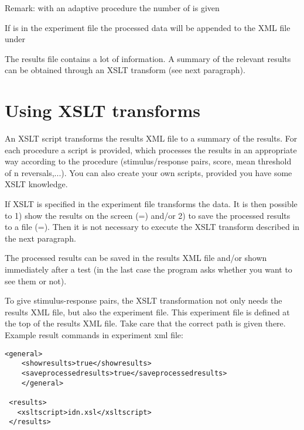 Remark: with an adaptive procedure the number of
 is given

If  is  in the experiment
file the processed data will be appended to the XML file under

The results file contains a lot of information. A summary of the
relevant results can be obtained through an XSLT transform (see
next paragraph).

\section{Using XSLT transforms}

An XSLT script transforms the results XML file to a summary of the
results. For each \apex procedure a script is provided, which
processes the results in an appropriate way according to the
procedure (stimulus/response pairs, score, mean threshold of n
reversals,...). You can also create your own scripts, provided you
have some XSLT knowledge.

If XSLT is specified in the experiment file \apex transforms the
data. It is then possible to 1) show the results on the screen
(=) and/or 2) to save the processed
results to a file (=).
Then it is not necessary to execute the XSLT transform described
in the next paragraph.

\label{sec:Using XSLT transforms}


The processed results can be saved in the results XML file and/or
shown immediately after a test (in the last case the program asks
whether you want to see them or not).

To give stimulus-response pairs, the XSLT transformation not only
needs the results XML file, but also the experiment file. This
experiment file is defined at the top of the results XML file.
Take care that the correct path is given there.
\newline
\newline Example result commands in experiment xml file:
\begin{verbatim}
<general>
    <showresults>true</showresults>
    <saveprocessedresults>true</saveprocessedresults>
    </general>

 <results>
   <xsltscript>idn.xsl</xsltscript>
 </results>
 \end{verbatim}
